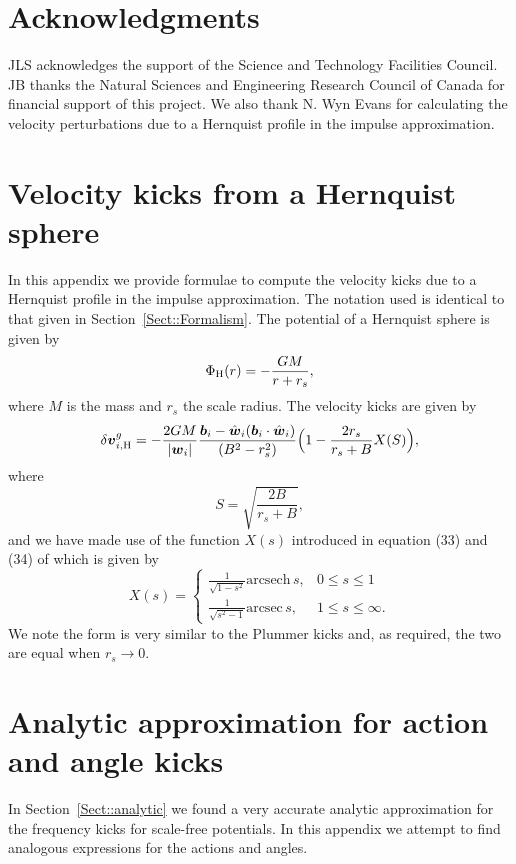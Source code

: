 \documentclass[useAMS,usenatbib,fleqn,a4paper]{mn2e}
\newcommand{\bs}[1]{\bmath{#1}}
\begin{document}
\section*{Acknowledgments}
JLS acknowledges the support of the Science and Technology Facilities
Council. JB thanks the Natural Sciences and Engineering Research
Council of Canada for financial support of this project. We also thank
N. Wyn Evans for calculating the velocity perturbations due to a
Hernquist profile in the impulse approximation.




\appendix
\section{Velocity kicks from a Hernquist sphere}\label{App::Hernquist}
In this appendix we provide formulae to compute the velocity kicks due to a Hernquist profile in the impulse approximation. The notation used is identical to that given in Section~\ref{Sect::Formalism}.
The potential of a Hernquist sphere \citep{Hernquist1990} is given by
\begin{equation}
\Phi_{\rm H}(r) = -\frac{GM}{r+r_s},
\end{equation}
where $M$ is the mass and $r_s$ the scale radius. The velocity kicks are given by
\begin{equation}
\delta\bs{v}^{g}_{i,\mathrm{H}} = -\frac{2GM}{|\bs{w}_i|}
\frac{\bs{b}_i-\hat{\bs{w}}_i(\bs{b}_i\cdot\hat{\bs{w}}_i)}
{(B^2-r_s^2)}\Big(1-\frac{2r_s}{r_s+B}X(S)\Big),
\label{curved_hernquist}
\end{equation}
where
\begin{equation}
S=\sqrt{\frac{2B}{r_s+B}},
\end{equation}
and we have made use of the function $X(s)$ introduced in equation (33) and (34) of \cite{Hernquist1990} which is given by
\begin{equation}
X(s)=\begin{cases}
    \frac{1}{\sqrt{1-s^2}}\mathrm{arcsech}\,s,& 0\leq s\leq 1\\
    \frac{1}{\sqrt{s^2-1}}\mathrm{arcsec}\,s, & 1\leq s\leq \infty.
\end{cases}
\end{equation}
We note the form is very similar to the Plummer kicks and, as required, the two are equal when $r_s\rightarrow0$.

\section{Analytic approximation for action and angle kicks}\label{Appendix::Analytic}
In Section~\ref{Sect::analytic} we found a very accurate analytic approximation for the frequency kicks for scale-free potentials. In this appendix we attempt to find analogous expressions for the actions and angles.
\end{document}
